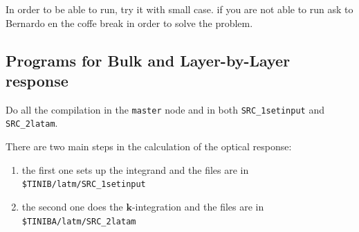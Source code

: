 \documentclass[openany,oneside]{book}
\numberwithin{equation}{section}
\begin{document}
In order to be able to run, try it with small case. 
if you are not able to run ask to Bernardo en the coffe 
break in order to solve the problem. 

\subsection{Programs for Bulk and Layer-by-Layer response}
\label{sec:programs}

Do all the compilation in the \verb=master= node and in both 
\verb=SRC_1setinput=
and
\verb=SRC_2latam=.

There are two main steps in the calculation of the optical response:

\begin{enumerate}

\item the first one sets up the integrand and the
files are in\\
\verb=$TINIB/latm/SRC_1setinput=
\item the second one does the $\mathbf{k}$-integration and the files
  are in\\
\verb=$TINIBA/latm/SRC_2latam=
\end{enumerate}
\end{document}
